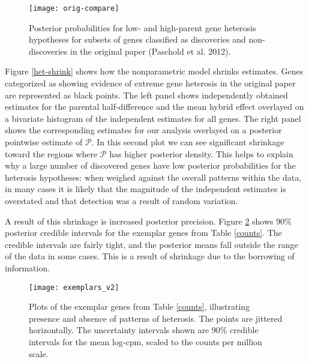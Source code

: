 \begin{figure}[h!]
\centering
\texttt{[image: orig-compare]}
\begin{minipage}{.8\textwidth}
\caption{\small Posterior probabilities for low- and high-parent gene heterosis hypotheses for subsets of genes classified as discoveries and non-discoveries in the original paper (Paschold et al. 2012).}
\label{orig-compare}
\end{minipage}
\end{figure}

Figure \ref{het-shrink} shows how the nonparametric model shrinks estimates. Genes categorized as showing evidence of extreme gene heterosis in the original paper are represented as black points. The left panel shows independently obtained estimates for the parental half-difference and the mean hybrid effect overlayed on a bivariate histogram of the independent estimates for all genes. The right
panel shows the corresponding estimates for our analysis overlayed on a posterior pointwise estimate of $\mathcal{P}$. In this second plot we can see significant shrinkage toward the regions where $\mathcal{P}$ has higher posterior density. This helps to explain why a large number of discovered genes have low posterior probabilities for the heterosis hypotheses: when weighed against the overall patterns within the data, in many cases it is likely that the magnitude of the independent estimates is overstated and that detection was a result of random variation.

A result of this shrinkage is increased posterior precision. Figure \ref{exemplars} shows 90\% posterior credible intervals for the exemplar genes from Table \ref{counts}. The credible intervals are fairly tight, and the posterior means fall outside the range of the data in some cases. This is a result of shrinkage due to the borrowing of information.

\begin{figure}[ht!]
\centering
\texttt{[image: exemplars\_v2]}
\begin{minipage}{.8\textwidth}
\caption{\small Plots of the exemplar genes from Table \ref{counts}, illustrating presence and absence of patterns of heterosis. The points are jittered horizontally. The uncertainty intervals shown are 90\% credible intervals for the mean log-cpm, scaled to the counts per million scale.}
\label{exemplars}
\end{minipage}
\end{figure}

